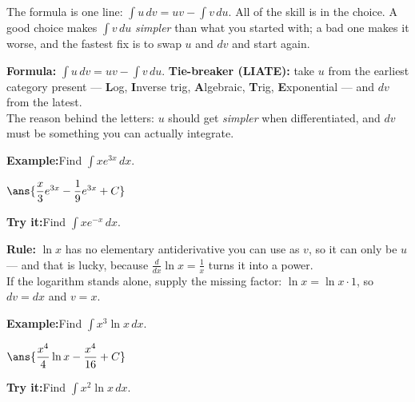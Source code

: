 \documentclass[12pt]{article}
\begin{document}

\noindent\small The formula is one line: $\int u\,dv = uv - \int v\,du$. All of
the skill is in the choice. A good choice makes $\int v\,du$ \emph{simpler} than
what you started with; a bad one makes it worse, and the fastest fix is to swap
$u$ and $dv$ and start again.\normalsize

\begin{formulabox}
\textbf{Formula:} $\displaystyle\int u\,dv = uv - \int v\,du$. \quad
\textbf{Tie-breaker (LIATE):} take $u$ from the earliest category present ---
\textbf{L}og, \textbf{I}nverse trig, \textbf{A}lgebraic, \textbf{T}rig,
\textbf{E}xponential --- and $dv$ from the latest.\\[3pt]
The reason behind the letters: $u$ should get \emph{simpler} when
differentiated, and $dv$ must be something you can actually integrate.
\end{formulabox}
\begin{examplebox}
\textbf{Example:}\quad Find $\displaystyle\int x e^{3x}\,dx$.

$\ans{\dfrac{x}{3}e^{3x} - \dfrac{1}{9}e^{3x} + C}$
\end{examplebox}
\begin{tryitbox}
\textbf{Try it:}\quad Find $\displaystyle\int x e^{-x}\,dx$.\\[2pt]
\end{tryitbox}

\begin{formulabox}
\textbf{Rule:} $\ln x$ has no elementary antiderivative you can use as $v$, so
it can only be $u$ --- and that is lucky, because
$\frac{d}{dx}\ln x = \frac{1}{x}$ turns it into a power.\\[3pt]
If the logarithm stands alone, supply the missing factor: $\ln x = \ln x \cdot 1$,
so $dv = dx$ and $v = x$.
\end{formulabox}
\begin{examplebox}
\textbf{Example:}\quad Find $\displaystyle\int x^{3}\ln x\,dx$.

$\ans{\dfrac{x^{4}}{4}\ln x - \dfrac{x^{4}}{16} + C}$
\end{examplebox}
\begin{tryitbox}
\textbf{Try it:}\quad Find $\displaystyle\int x^{2}\ln x\,dx$.\\[2pt]
\end{tryitbox}
\end{document}
